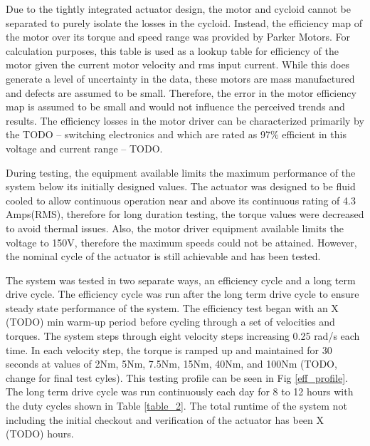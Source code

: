\documentclass[letterpaper, 10 pt, conference]{ieeeconf}  %
\begin{document}
Due to the tightly integrated actuator design, the motor and cycloid cannot be separated to purely isolate the losses in the cycloid. Instead, the efficiency map of the motor over its torque and speed range was provided by Parker Motors. For calculation purposes, this table is used as a lookup table for efficiency of the motor given the current motor velocity and rms input current. While this does generate a level of uncertainty in the data, these motors are mass manufactured and defects are assumed to be small. Therefore, the error in the motor efficiency map is assumed to be small and would not influence the perceived trends and results. The efficiency losses in the motor driver can be characterized primarily by the TODO -- switching electronics and which are rated as 97\% efficient in this voltage and current range -- TODO. 

During testing, the equipment available limits the maximum performance of the system below its initially designed values. The actuator was designed to be fluid cooled to allow continuous operation near and above its continuous rating of 4.3 Amps(RMS), therefore for long duration testing, the torque values were decreased to avoid thermal issues. Also, the motor driver equipment available limits the voltage to 150V, therefore the maximum speeds could not be attained. However, the nominal cycle of the actuator is still achievable and has been tested. 

The system was tested in two separate ways, an efficiency cycle and a long term drive cycle. The efficiency cycle was run after the long term drive cycle to ensure steady state performance of the system. The efficiency test began with an X (TODO) min warm-up period before cycling through a set of velocities and torques. The system steps through eight velocity steps increasing 0.25 rad/s each time. In each velocity step, the torque is ramped up and maintained for 30 seconds at values of 2Nm, 5Nm, 7.5Nm, 15Nm, 40Nm, and 100Nm (TODO, change for final test cyles). This testing profile can be seen in Fig \ref{eff_profile}. The long term drive cycle was run continuously each day for 8 to 12 hours with the duty cycles shown in Table \ref{table_2}. The total runtime of the system not including the initial checkout and verification of the actuator has been X (TODO) hours. 
\end{document}
